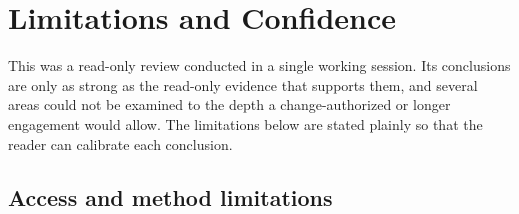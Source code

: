 \section{Limitations and Confidence}\label{sec:limits}

This was a read-only review conducted in a single working session. Its conclusions
are only as strong as the read-only evidence that supports them, and several areas
could not be examined to the depth a change-authorized or longer engagement would
allow. The limitations below are stated plainly so that the reader can calibrate
each conclusion.

\subsection{Access and method limitations}

